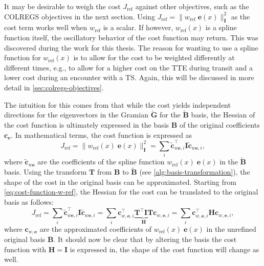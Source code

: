 It may be desirable to weigh the cost $J_\text{ref}$ against other objectives, such as the COLREGS objectives in the next section.
Using $J_\text{ref}=\| w_\text{ref}\;\mathbf e(x)\|_{\mathbf I}^2$ as the cost term works well when $w_\text{ref}$ is a scalar. If however, $w_\text{ref}(x)$ is a spline function itself, the oscillatory behavior of the cost function may return. This was discovered during the work for this thesis. The reason for wanting to use a spline function for $w_\text{ref}(x)$ is to allow for the cost to be weighted differently at different times, e.g., to allow for a higher cost on the TTE during transit and a lower cost during an encounter with a \acrshort{TS}. Again, this will be discussed in more detail in \cref{sec:colregs-objectives}.

The intuition for this comes from that while the cost yields independent directions for the eigenvectors in the Gramian $\mathbf{\tilde G}$ for the $\mathbf{\tilde B}$ basis, the Hessian of the cost function is ultimately expressed in the basis $\mathbf B$ of the original coefficients $\mathbf c_\mathbf e$. In mathematical terms, the cost function is expressed as
\begin{equation}\label{eq:cost-function-w-ref}
    J_\text{ref} = \|w_\text{ref}(x)\;\mathbf e(x)\|_{\mathbf I}^2 = \sum_i \mathbf{\tilde c}_{w \mathbf{e},i}^\top \mathbf I \mathbf{\tilde c}_{w \mathbf{e},i},
\end{equation}
where $\mathbf{\tilde c}_{w \mathbf{e}}$ are the coefficients of the spline function $w_\text{ref}(x)\;\mathbf e(x)$ in the $\mathbf{\tilde B}$ basis.  Using the transform $\mathbf T$ from $\mathbf B$ to $\mathbf{\tilde B}$ (see \cref{alg:basis-transformation}), the shape of the cost in the original basis can be approximated. Starting from \cref{eq:cost-function-w-ref}, the Hessian for the cost can be translated to the original basis as follows:
\begin{equation}\label{eq:cost-function-w-ref-derivation}
        J_\text{ref} = \sum_i \mathbf{\tilde c}_{w \mathbf{e},i}^\top \mathbf I \mathbf{\tilde c}_{w \mathbf{e},i} 
        = \sum_i \mathbf c_{w,\mathbf e,i}^\top \underbrace{\mathbf T^\top \mathbf I \mathbf T}_{\mathbf H} \mathbf c_{w,\mathbf e,i} 
        = \sum_i \mathbf c_{w,\mathbf e,i}^\top \mathbf H \mathbf c_{w,\mathbf e,i},
\end{equation}
where $\mathbf c_{w,\mathbf e}$ are the approximated coefficients of $w_\text{ref}(x)\;\mathbf e(x)$ in the unrefined original basis $\mathbf B$. It should now be clear that by altering the basis the cost function with $\mathbf H=\mathbf I$ is expressed in, the shape of the cost function will change as well.


